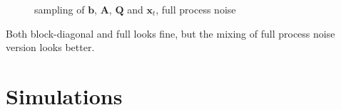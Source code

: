 \documentclass[]{article}
\begin{document}
\begin{figure}[h!]
	\caption{sampling of $\mathbf{b}$, $\mathbf{A}$, $\mathbf{Q}$ and $\mathbf{x}_t$, full process noise}
	\label{bAQX_full}
\end{figure}

Both block-diagonal and full looks fine, but the mixing of  full process noise version looks better.


\section{Simulations}\label{sim}
\end{document}
